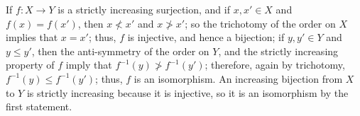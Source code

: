 \documentclass{article}
\begin{document}
\begin{solution}[\ref{exe:v1tw1ijd}]
  \label{sol:rd6deawb}
  If \(f : X \to Y\) is a strictly increasing surjection, and if
  \(x, x' \in X\) and \(f(x) = f(x')\), then \(x \nless x'\) and
  \(x \ngtr x'\); so the trichotomy of the order on \(X\) implies that
  \(x = x'\); thus, \(f\) is injective, and hence a bijection; if
  \(y, y' \in Y\) and \(y \leq y'\), then the anti-symmetry of the
  order on \(Y\), and the strictly increasing property of \(f\) imply
  that \(f^{-1}(y) \ngtr f^{-1}(y')\); therefore, again by trichotomy,
  \(f^{-1}(y) \leq f^{-1}(y')\); thus, \(f\) is an isomorphism.  An
  increasing bijection from \(X\) to \(Y\) is strictly increasing
  because it is injective, so it is an isomorphism by the first
  statement.
\end{solution}
\end{document}
